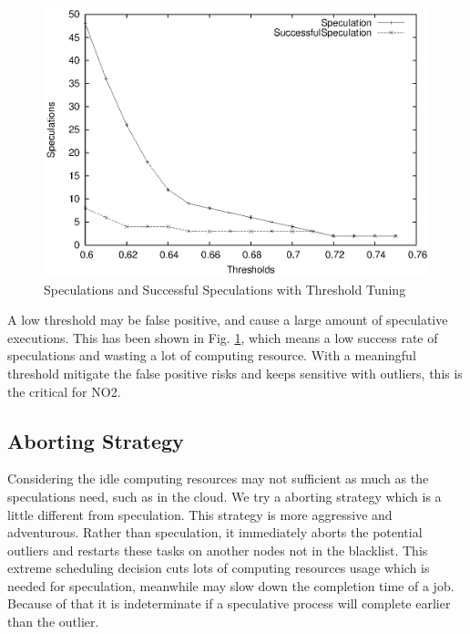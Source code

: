 \begin{figure}
\centering
\includegraphics[width=0.9\columnwidth]{figures/threshold&speculation.eps}
\caption{Speculations and Successful Speculations with Threshold Tuning}
\label{figure:thresholdtuning}
\end{figure}

A low threshold may be false positive, and cause a large amount of speculative executions. This has been shown in Fig.  \ref{figure:thresholdtuning}, which means a low success rate of speculations and wasting a lot of computing resource. With a meaningful threshold mitigate the false positive risks and keeps sensitive with outliers, this is the critical for NO2.

\subsection{Aborting Strategy}

Considering the idle computing resources may not sufficient as much as the speculations need, such as in the cloud. We try a aborting strategy which is a little different from speculation. This strategy is more aggressive and adventurous. Rather than speculation, it immediately aborts the potential outliers and restarts these tasks on another nodes not in the blacklist. This extreme scheduling decision cuts lots of computing resources usage which is needed for speculation, meanwhile may slow down the completion time of a job. Because of that it is indeterminate if a speculative process will complete earlier than the outlier.

